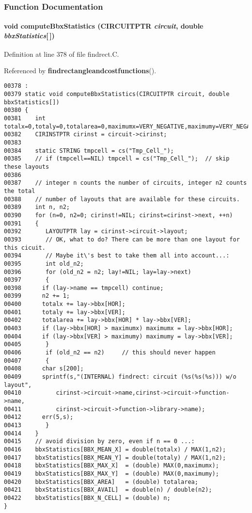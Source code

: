 \subsubsection{Function Documentation}
\label{findrect.C_a21}
\paragraph{\setlength{\rightskip}{0pt plus 5cm}void compute\-Bbx\-Statistics (CIRCUITPTR {\em circuit}, double {\em bbx\-Statistics}[$\,$])\hspace{0.3cm}{\tt  [static]}}\hfill



Definition at line 378 of file findrect.C.

Referenced by {\bf findrectangleandcostfunctions}().\small\begin{verbatim}00378 :
00379 static void computeBbxStatistics(CIRCUITPTR circuit, double bbxStatistics[])
00380 {
00381    int totalx=0,totaly=0,totalarea=0,maximumx=VERY_NEGATIVE,maximumy=VERY_NEGATIVE;
00382    CIRINSTPTR cirinst = circuit->cirinst;
00383 
00384    static STRING tmpcell = cs("Tmp_Cell_");
00385    // if (tmpcell==NIL) tmpcell = cs("Tmp_Cell_");  // skip these layouts
00386 
00387    // integer n counts the number of circuits, integer n2 counts the total
00388    // number of layouts that are available for these circuits.
00389    int n, n2;
00390    for (n=0, n2=0; cirinst!=NIL; cirinst=cirinst->next, ++n)
00391    {
00392       LAYOUTPTR lay = cirinst->circuit->layout;
00393       // OK, what to do? There can be more than one layout for this cicuit.
00394       // Maybe it\'s best to take them all into account...:
00395       int old_n2;
00396       for (old_n2 = n2; lay!=NIL; lay=lay->next)
00397       {
00398      if (lay->name == tmpcell) continue;
00399      n2 += 1;
00400      totalx += lay->bbx[HOR];
00401      totaly += lay->bbx[VER];
00402      totalarea += lay->bbx[HOR] * lay->bbx[VER];
00403      if (lay->bbx[HOR] > maximumx) maximumx = lay->bbx[HOR];
00404      if (lay->bbx[VER] > maximumy) maximumy = lay->bbx[VER];
00405       }
00406       if (old_n2 == n2)     // this should never happen
00407       {
00408      char s[200];
00409      sprintf(s,"(INTERNAL) findrect: circuit (%s(%s(%s))) w/o layout",
00410          cirinst->circuit->name,cirinst->circuit->function->name,
00411          cirinst->circuit->function->library->name);
00412      err(5,s);
00413       }
00414    }
00415    // avoid division by zero, even if n == 0 ...:
00416    bbxStatistics[BBX_MEAN_X] = double(totalx) / MAX(1,n2);
00417    bbxStatistics[BBX_MEAN_Y] = double(totaly) / MAX(1,n2);
00418    bbxStatistics[BBX_MAX_X]  = (double) MAX(0,maximumx);
00419    bbxStatistics[BBX_MAX_Y]  = (double) MAX(0,maximumy);
00420    bbxStatistics[BBX_AREA]   = (double) totalarea;
00421    bbxStatistics[BBX_AVAIL]  = double(n) / double(n2);
00422    bbxStatistics[BBX_N_CELL] = (double) n;
}
\end{verbatim}\normalsize 
\label{findrect.C_a17}
